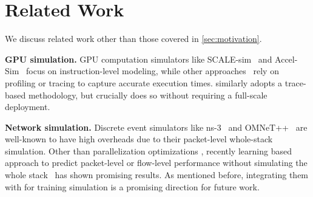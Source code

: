 
\section{Related Work}
\label{sec:related}

\noindent We discuss related work other than those covered in \cref{sec:motivation}.

\noindent\textbf{GPU simulation.}
GPU computation simulators like SCALE-sim~\cite{samajdar2018scale} and Accel-Sim~\cite{khairy2020accel} focus on instruction-level modeling, while other approaches~\cite{hu2022dpro,lu2023distsim,luo2022srifty,zhu2020daydream} rely on profiling or tracing to capture accurate \op execution times. \sys similarly adopts a trace-based methodology, but crucially does so without requiring a full-scale deployment.




\noindent\textbf{Network simulation.} 
Discrete event simulators like ns-3~\cite{riley2010ns} and OMNeT++~\cite{varga2019practical} are well-known to have high overheads due to their packet-level whole-stack simulation. Other than parallelization optimizations \cite{GCLL23,BZTW24}, recently learning based approach to predict packet-level or flow-level performance without simulating the whole stack~\cite{ZNKY21,li2024m3,YPCL22} has shown promising results.
As mentioned before, integrating them with \sys for training simulation is a promising direction for future work. 

